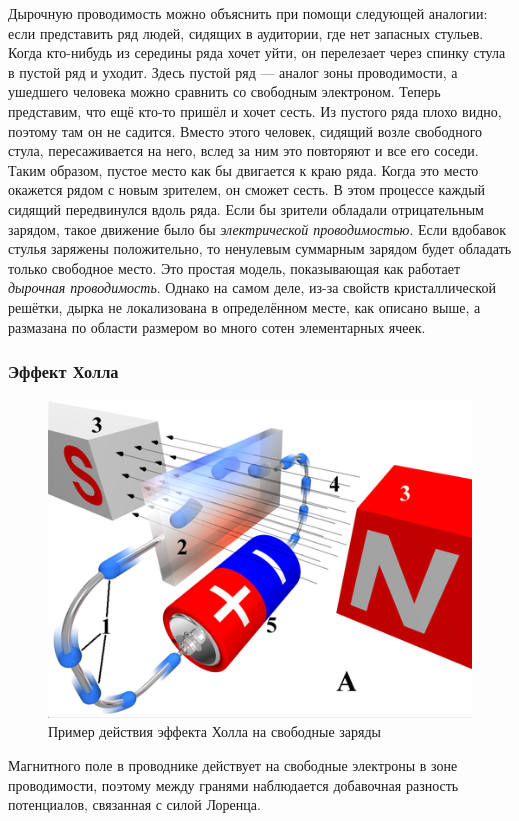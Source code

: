 \documentclass[a4paper, 12pt]{article}
\begin{document}
Дырочную проводимость можно объяснить при помощи следующей аналогии: если представить ряд людей, сидящих в аудитории, где нет запасных стульев. Когда кто-нибудь из середины ряда хочет уйти, он      перелезает через спинку стула в пустой ряд и уходит. Здесь пустой ряд — аналог зоны проводимости, а ушедшего человека можно сравнить со свободным электроном.
Теперь представим, что ещё кто-то пришёл и хочет сесть. Из пустого ряда плохо видно, поэтому там он не садится. Вместо этого человек, сидящий возле свободного стула, пересаживается на него, вслед за ним это повторяют и все его соседи. Таким образом, пустое место как бы двигается к краю ряда. Когда это место окажется рядом с новым зрителем, он сможет сесть.
В этом процессе каждый сидящий передвинулся вдоль ряда. Если бы зрители обладали отрицательным зарядом, такое движение было бы  \textit{электрической проводимостью}. Если вдобавок стулья заряжены положительно, то ненулевым суммарным зарядом будет обладать только свободное место. Это простая модель, показывающая как работает \textit{дырочная проводимость}. Однако на самом деле, из-за свойств кристаллической решётки, дырка не локализована в определённом месте, как описано выше, а размазана по области размером во много сотен элементарных ячеек.

\subsubsection*{Эффект Холла}


\begin {figure}[H]
	\begin{center}
		\includegraphics[width = 0.6 \textwidth]{Hall_effect}
		\caption{Пример действия эффекта Холла на свободные заряды}
	\end{center}
\end {figure}


Магнитного поле в проводнике действует на свободные электроны в зоне проводимости, поэтому между гранями наблюдается добавочная разность потенциалов, связанная с силой Лоренца. 
\end{document}
